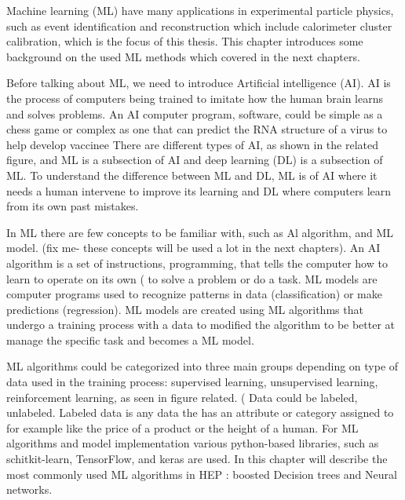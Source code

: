 Machine learning (ML) have many applications in experimental particle physics, such as event identification and reconstruction which include calorimeter cluster calibration, which is the focus of this thesis. This chapter introduces some background on the used ML methods which covered in the next chapters. %

Before talking about ML, we need to introduce Artificial intelligence (AI). AI is the process of computers being trained to imitate how the human brain learns and solves problems. An AI computer program, software, could be simple as a chess game or complex as one that can predict the RNA structure of a virus to help develop vaccinee %
There are different types of AI, as shown in the related figure, and ML is a subsection of AI and deep learning (DL) is a subsection of ML. To understand the difference between ML and DL, ML is of AI where it needs a human intervene to improve its learning and DL where computers learn from its own past mistakes. %

In ML there are few concepts to be familiar with, such as Al algorithm, and ML model. (fix me- these concepts will be used a lot in the next chapters). An AI algorithm is a set of instructions, programming, that tells the computer how to learn to operate on its own (%
to solve a problem or do a task. ML models are computer programs used to recognize patterns in data (classification) or make predictions (regression). ML models are created using ML algorithms that undergo a training process with a data to modified the algorithm to be better at manage the specific task and becomes a ML model. %

ML algorithms could be categorized into three main groups depending on type of data used in the training process: supervised learning, unsupervised learning, reinforcement learning, as seen in figure related. (%
Data could be labeled, unlabeled. Labeled data is any data the has an attribute or category assigned to for example like the price of a product or the height of a human. For ML algorithms and model implementation various python-based libraries, such as schitkit-learn, TensorFlow, and keras are used. In this chapter will describe the most commonly used ML algorithms in HEP %
: boosted Decision trees and Neural networks.


